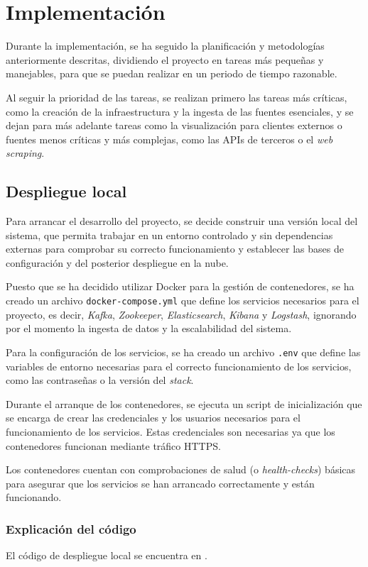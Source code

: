 \chapter{Implementación}
Durante la implementación, se ha seguido la planificación y metodologías
anteriormente descritas, dividiendo el proyecto en tareas más pequeñas y
manejables, para que se puedan realizar en un periodo de tiempo razonable.

Al seguir la prioridad de las tareas, se realizan primero las tareas más
críticas, como la creación de la infraestructura y la ingesta de las fuentes
esenciales, y se dejan para más adelante tareas como la visualización para
clientes externos o fuentes menos críticas y más complejas, como las APIs de
terceros o el \textit{web scraping}.


\section{Despliegue local}\label{sec:impl_local}
Para arrancar el desarrollo del proyecto, se decide construir una versión
local del sistema, que permita trabajar en un entorno controlado y sin
dependencias externas para comprobar su correcto funcionamiento y establecer
las bases de configuración y del posterior despliegue en la nube.

Puesto que se ha decidido utilizar Docker para la gestión de contenedores, se
ha creado un archivo \texttt{docker-compose.yml} que define los servicios
necesarios para el proyecto, es decir, \textit{Kafka}, \textit{Zookeeper},
\textit{Elasticsearch}, \textit{Kibana} y \textit{Logstash}, ignorando por
el momento la ingesta de datos y la escalabilidad del sistema.

Para la configuración de los servicios, se ha creado un archivo \texttt{.env}
que define las variables de entorno necesarias para el correcto funcionamiento
de los servicios, como las contraseñas o la versión del \textit{stack}.

Durante el arranque de los contenedores, se ejecuta un script de inicialización
que se encarga de crear las credenciales y los usuarios necesarios para el
funcionamiento de los servicios. Estas credenciales son necesarias ya que los
contenedores funcionan mediante tráfico HTTPS.

Los contenedores cuentan con comprobaciones de salud (o \textit{health-checks})
básicas para asegurar que los servicios se han arrancado correctamente y están
funcionando.

\newpage{}
\subsection{Explicación del código}
El código de despliegue local se encuentra en .

